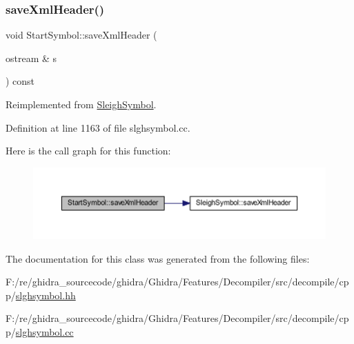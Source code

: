\subsubsection{\texorpdfstring{saveXmlHeader()}{saveXmlHeader()}}
{\footnotesize\ttfamily void Start\+Symbol\+::save\+Xml\+Header (\begin{DoxyParamCaption}\item[{ostream \&}]{s }\end{DoxyParamCaption}) const\hspace{0.3cm}{\ttfamily [virtual]}}



Reimplemented from \mbox{\hyperlink{class_sleigh_symbol_ac501be7c584bc0568c29fb95910962e9}{Sleigh\+Symbol}}.



Definition at line 1163 of file slghsymbol.\+cc.

Here is the call graph for this function\+:
\nopagebreak
\begin{figure}[H]
\begin{center}
\leavevmode
\includegraphics[width=350pt]{class_start_symbol_add42ff46eba0c8adbc75164f8ac7780d_cgraph}
\end{center}
\end{figure}


The documentation for this class was generated from the following files\+:\begin{DoxyCompactItemize}
\item 
F\+:/re/ghidra\+\_\+sourcecode/ghidra/\+Ghidra/\+Features/\+Decompiler/src/decompile/cpp/\mbox{\hyperlink{slghsymbol_8hh}{slghsymbol.\+hh}}\item 
F\+:/re/ghidra\+\_\+sourcecode/ghidra/\+Ghidra/\+Features/\+Decompiler/src/decompile/cpp/\mbox{\hyperlink{slghsymbol_8cc}{slghsymbol.\+cc}}\end{DoxyCompactItemize}
